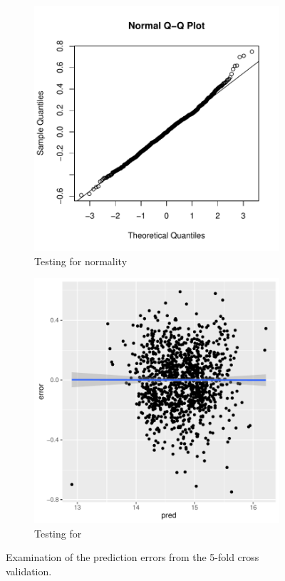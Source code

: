 \begin{figure}[H]
\centering
\begin{subfigure}[b]{0.5\textwidth}
    \centering
    \includegraphics[width = \textwidth]{figures/Nanna/Normal.pdf}
    \caption{Testing for normality}
    \label{fig:cv_normal}
\end{subfigure}%
\begin{subfigure}[b]{0.5\textwidth}
\centering
    \includegraphics[width = \textwidth]{figures/Nanna/Homo.pdf}
    \caption{Testing for \hetero}
    \label{fig:cv_homo}
\end{subfigure}
\caption{Examination of the prediction errors from the 5-fold cross validation.}
\label{fig:cv_normal_homo}
\end{figure}


